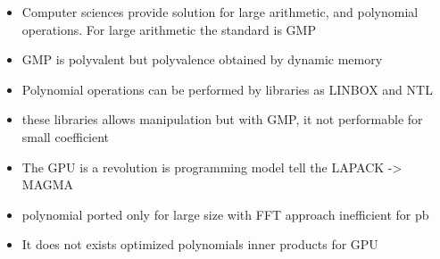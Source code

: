 \documentclass[oribibl]{llncs2e/llncs}
\begin{document}
\begin{itemize}
\item Computer sciences provide solution for large arithmetic, and polynomial operations. For large arithmetic the standard is GMP
\item  GMP is polyvalent but polyvalence obtained by dynamic memory 
\item Polynomial operations can be performed by libraries as LINBOX and NTL
\item these libraries allows manipulation but with GMP, it not performable for small coefficient
\item  The GPU is a revolution is programming model tell the LAPACK -> MAGMA 
\item polynomial ported only for large size with FFT approach inefficient for pb 
\item It does not exists optimized polynomials inner products for GPU
\end{itemize}



\end{document}

